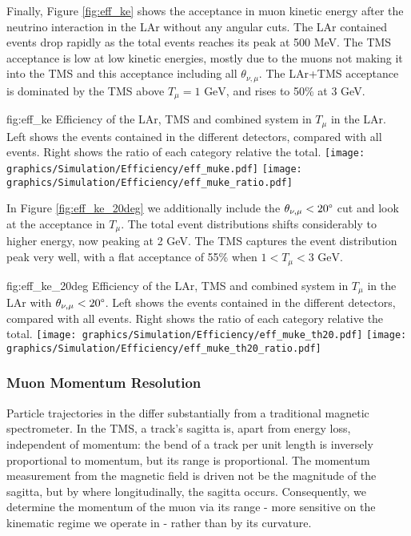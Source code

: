 Finally, Figure \ref{fig:eff_ke} shows the acceptance in muon kinetic energy after the neutrino interaction in the LAr without any angular cuts. The LAr contained events drop rapidly as the total events reaches its peak at 500 MeV. The TMS acceptance is low at low kinetic energies, mostly due to the muons not making it into the TMS and this acceptance including all $\theta_{\nu,\mu}$. The LAr+TMS acceptance is dominated by the TMS above $T_\mu=1\text{ GeV}$, and rises to 50\% at 3 GeV. 
\begin{dunefigure}[]{fig:eff_ke}
{Efficiency of the LAr, TMS and combined system in $T_\mu$ in the LAr. Left shows the events contained in the different detectors, compared with all events. Right shows the ratio of each category relative the total.}
\texttt{[image: graphics/Simulation/Efficiency/eff\_muke.pdf]} \texttt{[image: graphics/Simulation/Efficiency/eff\_muke\_ratio.pdf]}
\end{dunefigure}

In Figure \ref{fig:eff_ke_20deg} we additionally include the $\theta_{\nu,\mu}<20\degree$ cut and look at the acceptance in $T_\mu$. The total event distributions shifts considerably to higher energy, now peaking at 2 GeV. The TMS captures the event distribution peak very well, with a flat acceptance of 55\% when $1 < T_\mu < 3 \text{ GeV}$.
\begin{dunefigure}[]{fig:eff_ke_20deg}
{Efficiency of the LAr, TMS and combined system in $T_\mu$ in the LAr with $\theta_{\nu,\mu}<20\degree$. Left shows the events contained in the different detectors, compared with all events. Right shows the ratio of each category relative the total.}
\texttt{[image: graphics/Simulation/Efficiency/eff\_muke\_th20.pdf]} \texttt{[image: graphics/Simulation/Efficiency/eff\_muke\_th20\_ratio.pdf]}
\end{dunefigure}

\subsubsection{Muon Momentum Resolution}

Particle trajectories in the  differ substantially from a traditional magnetic spectrometer. In the TMS, a track's sagitta is, apart from energy loss, independent of momentum: the bend of a track per unit length is inversely proportional to momentum, but its range is proportional. The momentum measurement from the magnetic field is driven not be the magnitude of the sagitta, but by where longitudinally, the sagitta occurs. Consequently, we determine the momentum of the muon via its range - more sensitive on the kinematic regime we operate in - rather than by its curvature.

